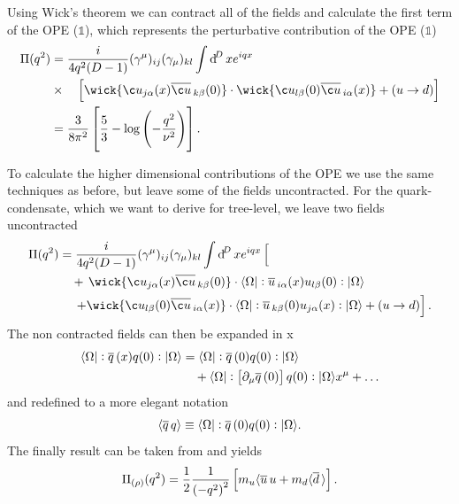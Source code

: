\documentclass[../../index.tex]{subfiles}
\begin{document}
Using Wick's theorem we can contract all of the fields and calculate the first
term of the OPE ($\mathbb{1}$), which represents the perturbative contribution
of the OPE ($\mathbb{1}$)
\begin{equation}
  \begin{split}
    \Pi(q^2) &= \frac{i}{4q^2(D-1)} (\gamma^\mu)_{ij} (\gamma_\mu)_{kl} \int \dif^D x e^{iqx} \\
    &\times\quad\left[
      \wick{ \c u_{j \alpha}(x) \anti{\c u}_{k \beta}(0)}
      \cdot \wick{\c u_{l \beta}(0) \anti{\c u}_{i \alpha}(x)} + (u \to d)
    \right] \\
    &= \frac{3}{8\pi^2} \left[ \frac{5}{3} - \log\left( -\frac{q^2}{\nu^2} \right) \right].
  \end{split}
\end{equation}

To calculate the higher dimensional contributions of the OPE we use the same
techniques as before, but leave some of the fields uncontracted. For the
quark-condensate, which we want to derive for tree-level, we leave two fields uncontracted
\begin{equation}
  \begin{split}
    \Pi(q^2) &= \frac{i}{4q^2(D-1)} (\gamma^\mu)_{ij} (\gamma_\mu)_{kl} \int \dif^D x e^{iqx} \left[ \phantom{\wick{ \c u_{j \alpha}(x) \anti{\c u}_{k \beta}(0)}} \right.\\
      &\quad+\,\wick{ \c u_{j \alpha}(x) \anti{\c u}_{k \beta}(0)} \cdot \langle \Omega \vert : \anti{u}_{i \alpha}(x) u_{l \beta} (0) :\vert \Omega \rangle \\
      &\quad\,\left.+\wick{\c u_{l \beta}(0) \anti{\c u}_{i \alpha}(x)} \cdot \langle \Omega \vert: \anti{u}_{k \beta}(0) u_{j \alpha}(x) : \vert \Omega \rangle + (u \to d)
    \right].
  \end{split}
\end{equation}
The non contracted fields can then be expanded in x
\begin{equation}
  \begin{split}
    \langle \Omega \vert: \overline{q}\,(x) q(0):\vert \Omega \rangle &= \langle\Omega\vert: \overline{q}\,(0) q(0): \vert\Omega\rangle\\
    &\quad+ \langle\Omega\vert:\left[ \partial_\mu \overline{q}\,(0) \right] q(0):\vert\Omega\rangle x^\mu + \dots
  \end{split}
\end{equation}
and redefined to a more elegant notation
\begin{equation}
  \langle \overline{q}\,q \rangle \equiv \langle\Omega\vert: \overline{q}\,(0) q(0):\vert\Omega\rangle.
\end{equation}
The finally result can be taken from \cite{Pascual1984} and yields
\begin{equation}
  \Pi_{(\rho)}(q^2) = \frac{1}{2} \frac{1}{\left(-q^2\right)^2} \left[ m_u\langle \overline{u}\, u + m_d \langle \overline{d}\, \rangle\right].
\end{equation}
\end{document}
